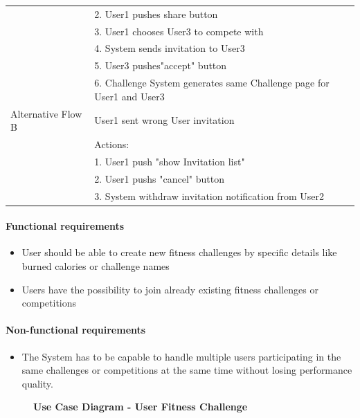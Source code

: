 \documentclass{article}
\begin{document}
\begin{table}[h!]
\begin{tabularx}{\textwidth}{|>{\raggedright\arraybackslash}p{}|X|}
                         & 2. User1 pushes share button \\
                         & 3. User1 chooses User3 to compete with\\
                         & 4. System sends invitation to User3 \\
                         & 5. User3 pushes"accept" button \\
                         & 6. Challenge System generates same Challenge page for User1 and User3 \\ \hline
        Alternative Flow B & User1 sent wrong User invitation \\
                         & Actions: \\
                         & 1. User1 push "show Invitation list" \\
                         & 2. User1 pushs "cancel" button \\
                         & 3. System withdraw invitation notification from User2\\ \hline
    \end{tabularx}
\end{table}

\paragraph{Functional requirements}
		\begin{itemize}
			\item  User should be able to create new fitness challenges by specific details like burned calories or
			challenge names
			\item  Users have the possibility to join already existing fitness challenges or competitions
		\end{itemize}
		
	\paragraph{Non-functional requirements}
		\begin{itemize}
			\item The System has to be capable to handle multiple users participating in the same challenges or
			competitions at the same time without losing performance quality.
			
		\end{itemize}

\clearpage

\begin{figure}[htbp]
	\textbf{Use Case Diagram - User Fitness Challenge}
	\centering
	\begin{subfigure}{\textwidth}
		\resizebox{\textwidth}{!}{}
	\end{subfigure}
	\begin{subfigure}{\textwidth}
	\end{subfigure}
\end{figure}
\end{document}

